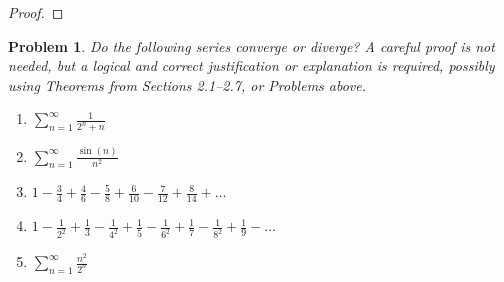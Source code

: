 \documentclass[12pt]{article}
\newtheorem{problem}{Problem}
\begin{document}
\begin{proof}
\end{proof}


\begin{problem} %
Do the following series converge or diverge?  A careful proof is not needed, but a logical and correct justification or explanation is required, possibly using Theorems from Sections 2.1--2.7, or Problems above.

\renewcommand{\labelenumi}{(\alph{enumi})}
\begin{enumerate}
\item $\sum_{n=1}^\infty \frac{1}{2^n+n}$


\item $\sum_{n=1}^\infty \frac{\sin(n)}{n^2}$


\item $1 - \frac{3}{4} + \frac{4}{6} - \frac{5}{8} + \frac{6}{10} - \frac{7}{12} + \frac{8}{14} + \dots$


\item $1 - \frac{1}{2^2} + \frac{1}{3} - \frac{1}{4^2} + \frac{1}{5} - \frac{1}{6^2} + \frac{1}{7} - \frac{1}{8^2} + \frac{1}{9} - \dots$


\item $\sum_{n=1}^\infty \frac{n^2}{2^n}$


\end{enumerate}
\end{problem}
\end{document}
